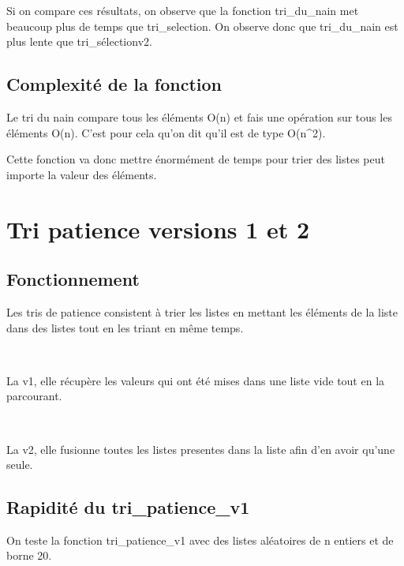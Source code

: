 \documentclass[a4paper, 12pt]{article}
\begin{document}
Si on compare ces résultats, on observe que la fonction tri\_du\_nain met beaucoup plus de temps que tri\_selection.
On observe donc que tri\_du\_nain est plus lente que tri\_sélectionv2.

\subsection{Complexité de la fonction}


Le tri du nain compare tous les éléments O(n) et fais une opération sur tous les éléments O(n). C'est pour cela qu'on dit qu'il est de type O(n^{2}). 

Cette fonction va donc mettre énormément de temps pour trier des listes peut importe la valeur des éléments. 



\section{Tri patience versions 1 et 2}

\subsection{Fonctionnement}

Les tris de patience consistent à trier les listes en mettant les éléments de la liste dans des listes tout en les triant en même temps. 

~

La v1, elle récupère les valeurs qui ont été mises dans une liste vide tout en la parcourant. 

~

La v2, elle fusionne toutes les listes presentes dans la liste afin d'en avoir qu'une seule. 

\subsection{Rapidité du tri\_patience\_v1}


On teste la fonction tri\_patience\_v1 avec des listes aléatoires de n entiers et de borne 20.

~
\end{document}

